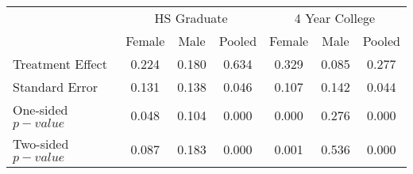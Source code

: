 \begin{tabular}{lcccccc} \hline \hline
 & \multicolumn{3}{c}{HS Graduate} & \multicolumn{3}{c}{4 Year College} \\
 & Female  & Male  & Pooled  & Female  & Male  & Pooled  \\  \hline 
Treatment Effect &     0.224 &     0.180 &     0.634 &     0.329 &     0.085 &     0.277 \\  
Standard Error &     0.131 &     0.138 &     0.046 &     0.107 &     0.142 &     0.044 \\  
One-sided $p-value$ &     0.048 &     0.104 &     0.000 &     0.000 &     0.276 &     0.000 \\  
Two-sided $p-value$ &     0.087 &     0.183 &     0.000 &     0.001 &     0.536 &     0.000 \\  
\hline \hline \end{tabular}